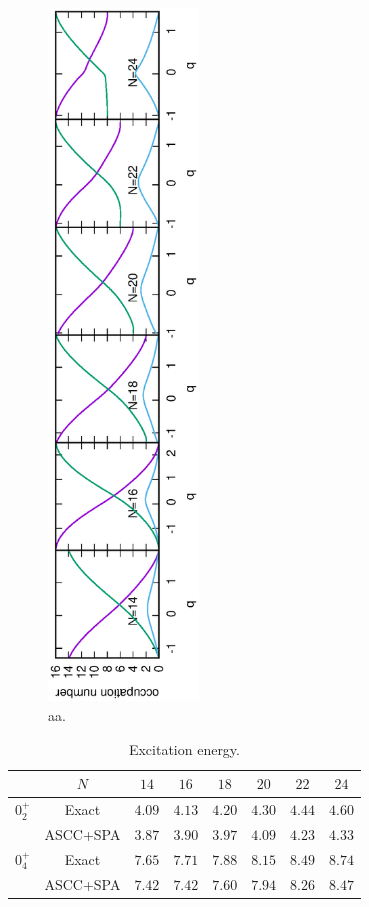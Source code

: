 \documentclass[%
superscriptaddress,
showpacs,
nofootinbib,
amsmath,amssymb,
aps,
prc,
twocolumn,
floatfix ]%
{revtex4-1}
\begin{document}
\begin{figure}[t]
 \begin{center}
  \includegraphics[width=40mm,angle=-90]{occ_number.eps}
 \end{center}
 \captionsetup{labelformat=empty,labelsep=none}
	\caption{aa.
}
 \label{fig:N8Pad}
\end{figure}

\begin{table}
\begin{ruledtabular}
\begin{tabular}{c|c|cccccc}
            & $N$ & $14$ & $16$ & $18$ & $20$ & $22$ & $24$\\ \hline
$0_2^+$ & Exact & $4.09$ & $4.13$ & $4.20$ & $4.30$ & $4.44$ & $4.60$\\
&ASCC+SPA & $3.87$ & $3.90$ & $3.97$ & $4.09$ & $4.23$ & $4.33$\\ \hline
$0_4^+$& Exact & $7.65$ & $7.71$ & $7.88$ & $8.15$ & $8.49$ & $8.74$\\
&ASCC+SPA & $7.42$ & $7.42$ & $7.60$ & $7.94$ & $8.26$ & $8.47$\\
\end{tabular}
\end{ruledtabular}
\caption{\label{ex}Excitation energy.}
\end{table}
\end{document}
